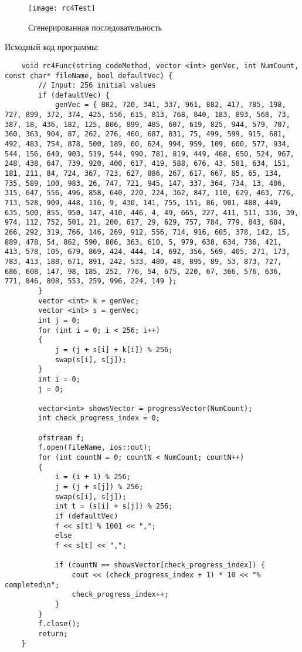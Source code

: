 \documentclass[bachelor, och, coursework]{shiza}
\begin{document}
	\begin{figure}[H]
		\centering
		\texttt{[image: rc4Test]}
		\caption{Сгенерированная последовательность}
		\label{fig:rc4Test}
	\end{figure}	
	
		Исходный код программы:
	
	\begin{verbatim}
	void rc4Func(string codeMethod, vector <int> genVec, int NumCount, const char* fileName, bool defaultVec) {
		// Input: 256 initial values
		if (defaultVec) {
			genVec = { 802, 720, 341, 337, 961, 882, 417, 785, 198, 727, 899, 372, 374, 425, 556, 615, 813, 768, 840, 183, 893, 568, 73, 387, 18, 436, 182, 125, 806, 899, 485, 607, 619, 825, 944, 579, 707, 360, 363, 904, 87, 262, 276, 460, 687, 831, 75, 499, 599, 915, 681, 492, 483, 754, 878, 500, 189, 60, 624, 994, 959, 109, 600, 577, 934, 544, 156, 640, 903, 519, 544, 990, 781, 819, 449, 468, 650, 524, 967, 248, 438, 647, 739, 920, 400, 617, 419, 588, 676, 43, 581, 634, 151, 181, 211, 84, 724, 367, 723, 627, 886, 267, 617, 667, 85, 65, 134, 735, 589, 100, 983, 26, 747, 721, 945, 147, 337, 364, 734, 13, 406, 315, 647, 556, 496, 858, 640, 220, 224, 362, 847, 110, 629, 463, 776, 713, 528, 909, 448, 116, 9, 430, 141, 755, 151, 86, 901, 488, 449, 635, 500, 855, 950, 147, 410, 446, 4, 49, 665, 227, 411, 511, 336, 39, 974, 112, 752, 501, 21, 200, 617, 29, 629, 757, 784, 779, 843, 684, 266, 292, 319, 766, 146, 269, 912, 556, 714, 916, 605, 378, 142, 15, 889, 478, 54, 862, 590, 806, 363, 610, 5, 979, 638, 634, 736, 421, 413, 578, 105, 679, 869, 424, 444, 14, 692, 356, 569, 405, 271, 173, 783, 413, 188, 671, 891, 242, 533, 480, 48, 895, 89, 53, 873, 727, 686, 608, 147, 98, 185, 252, 776, 54, 675, 220, 67, 366, 576, 636, 771, 846, 808, 553, 259, 996, 224, 149 };
		}
		vector <int> k = genVec;
		vector <int> s = genVec;
		int j = 0;
		for (int i = 0; i < 256; i++)
		{
			j = (j + s[i] + k[i]) % 256;
			swap(s[i], s[j]);
		}
		int i = 0;
		j = 0;
		
		vector<int> showsVector = progressVector(NumCount);
		int check_progress_index = 0;
		
		ofstream f;
		f.open(fileName, ios::out);
		for (int countN = 0; countN < NumCount; countN++)
		{
			i = (i + 1) % 256;
			j = (j + s[j]) % 256;
			swap(s[i], s[j]);
			int t = (s[i] + s[j]) % 256;
			if (defaultVec)
			f << s[t] % 1001 << ",";
			else
			f << s[t] << ",";
			
			if (countN == showsVector[check_progress_index]) {
				cout << (check_progress_index + 1) * 10 << "% completed\n";
				check_progress_index++;
			}
		}
		f.close();
		return;
	}
	\end{verbatim}
	
\end{document}
